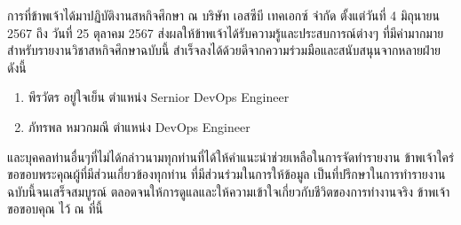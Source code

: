 \begin{acknowledgments}
    การที่ข้าพเจ้าได้มาปฏิบัติงานสหกิจศึกษา ณ บริษัท เอสซีบี เทคเอกซ์ จำกัด  ตั้งแต่วันที่ 4 มิถุนายน 2567  ถึง วันที่  25 ตุลาคม 2567  ส่งผลให้ข้าพเจ้าได้รับความรู้และประสบการณ์ต่างๆ ที่มีค่ามากมาย สำหรับรายงานวิชาสหกิจศึกษาฉบับนี้  สำเร็จลงได้ด้วยดีจากความร่วมมือและสนับสนุนจากหลายฝ่าย  ดังนี้
    \begin{enumerate}
        \item พีรวัตร อยู่ใจเย็น ตำแหน่ง Sernior DevOps Engineer
        \item ภัทรพล หมวกมณี ตำแหน่ง DevOps Engineer
    \end{enumerate}
    และบุคคลท่านอื่นๆที่ไม่ได้กล่าวนามทุกท่านที่ได้ให้คำแนะนำช่วยเหลือในการจัดทำรายงาน
	ข้าพเจ้าใคร่ขอขอบพระคุณผู้ที่มีส่วนเกี่ยวข้องทุกท่าน ที่มีส่วนร่วมในการให้ข้อมูล เป็นที่ปรึกษาในการทำรายงานฉบับนี้จนเสร็จสมบูรณ์ ตลอดจนให้การดูแลและให้ความเข้าใจเกี่ยวกับชีวิตของการทำงานจริง ข้าพเจ้าขอขอบคุณ ไว้ ณ ที่นี้
\end{acknowledgments}%
\fi %

\contentspage %

\ifproject
\tablelistpage
\figurelistpage

\fi %



